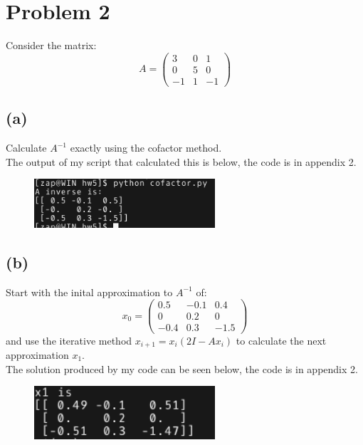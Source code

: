 \documentclass{article}
\begin{document}
\section*{Problem 2}
Consider the matrix:
\[A=\begin{pmatrix}3&0&1\\0&5&0\\-1&1&-1\end{pmatrix}\]

\subsection*{(a)}
Calculate $A^{-1}$ exactly using the cofactor method.\\
The output of my script that calculated this is below, the code is in appendix 2.
\begin{figure}[H]
    \centering
    \includegraphics[width=0.6\textwidth]{p21a.png}
\end{figure}

\subsection*{(b)}
Start with the inital approximation to $A^{-1}$ of:
\[x_0=\begin{pmatrix}0.5&-0.1&0.4\\0&0.2&0\\-0.4&0.3&-1.5\end{pmatrix}\]
and use the iterative method $x_{i+1}=x_i(2I-Ax_i)$ to calculate the next approximation $x_1$.\\
The solution produced by my code can be seen below, the code is in appendix 2.
\begin{figure}[H]
    \centering
    \includegraphics[width=0.6\textwidth]{p2a.png}
\end{figure}
\end{document}

